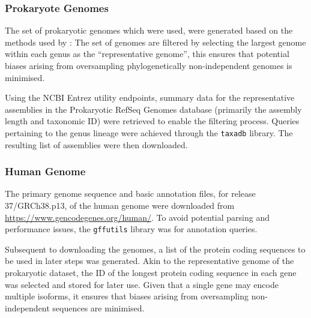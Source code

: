 \documentclass[../main.tex]{subfile}
\begin{document}
        \subsubsection{Prokaryote Genomes}
            The set of prokaryotic genomes which were used, were generated based on the methods used by \textcite{Ho2019}: The set of genomes are filtered by selecting the largest genome within each genus as the ``representative genome'', this ensures that potential biases arising from oversampling phylogenetically non-independent genomes is minimised.

            Using the NCBI Entrez utility endpoints, summary data for the representative assemblies in the Prokaryotic RefSeq Genomes database (primarily the assembly length and taxonomic ID) were retrieved to enable the filtering process. Queries pertaining to the genus lineage were achieved through the \texttt{taxadb} library. The resulting list of assemblies were then downloaded.
        \subsubsection{Human Genome}
            The primary genome sequence and basic annotation files, for release 37/GRCh38.p13, of the human genome were downloaded from \href{GENCODE}{https://www.gencodegenes.org/human/}. To avoid potential parsing and performance issues, the \texttt{gffutils} library was for annotation queries.

            Subsequent to downloading the genomes, a list of the protein coding sequences to be used in later steps was generated. Akin to the representative genome of the prokaryotic dataset, the ID of the longest protein coding sequence in each gene was selected and stored for later use. Given that a single gene may encode multiple isoforms, it ensures that biases arising from oversampling non-independent sequences are minimised.
\end{document}
